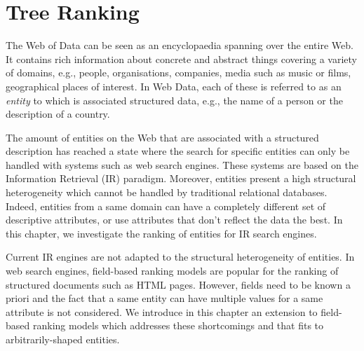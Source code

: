 \chapter{Tree Ranking}
\label{chap:tree-ranking}

The Web of Data can be seen as an encyclopaedia spanning over the entire Web. It contains rich information about concrete and abstract things covering a variety of domains, e.g., people, organisations, companies, media such as music or films, geographical places of interest. In Web Data, each of these is referred to as an \emph{entity} to which is associated structured data, e.g., the name of a person or the description of a country.

The amount of entities on the Web that are associated with a structured description has reached a state where the search for specific entities can only be handled with systems such as web search engines. These systems are based on the Information Retrieval (IR) paradigm. Moreover, entities present a high structural heterogeneity which cannot be handled by traditional relational databases. Indeed, entities from a same domain can have a completely different set of descriptive attributes, or use attributes that don't reflect the data the best. In this chapter, we investigate the ranking of entities for IR search engines.

Current IR engines are not adapted to the structural heterogeneity of entities. In web search engines, field-based ranking models are popular for the ranking of structured documents such as HTML pages. However, fields need to be known a priori and the fact that a same entity can have multiple values for a same attribute is not considered. We introduce in this chapter an extension to field-based ranking models which addresses these shortcomings and that fits to arbitrarily-shaped entities.